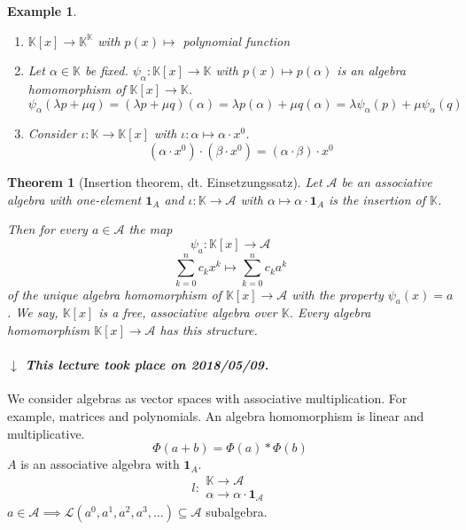 \documentclass{article}
\newcounter{lecref}[section]
\numberwithin{lecref}{section}
\newtheorem{theorem}[lecref]{Theorem}
\newtheorem{example}[lecref]{Example}
\newcommand{\dateref}[1]{%
  \begin{mdframed}[backgroundcolor=gray!10,innerbottommargin=0pt,innertopmargin=0pt]
    \paragraph{\textit{$\downarrow$ This lecture took place on #1.}}%
  \end{mdframed}%
}
\begin{document}
\begin{example} %
  \begin{enumerate}
    \item $\mathbb K[x] \to \mathbb K^{\mathbb K}$ with $p(x) \mapsto$ polynomial function
    \item
      Let $\alpha \in \mathbb K$ be fixed.
      $\psi_{\alpha}: \mathbb K[x] \to \mathbb K$ with $p(x) \mapsto p(\alpha)$ is an algebra homomorphism of $\mathbb K[x] \to \mathbb K$.
      \[ \psi_\alpha(\lambda p + \mu q) = (\lambda p + \mu q)(\alpha) = \lambda p(\alpha) + \mu q(\alpha) = \lambda \psi_{\alpha}(p) + \mu \psi_{\alpha}(q) \]
    \item Consider $\iota: \mathbb K \to \mathbb K[x]$ with $\iota: \alpha \mapsto \alpha \cdot x^0$.
      \[ (\alpha \cdot x^0) \cdot (\beta \cdot x^0) = (\alpha \cdot \beta) \cdot x^0 \]
  \end{enumerate}
\end{example}

\begin{theorem}[Insertion theorem, dt. \foreignlanguage{german}{Einsetzungssatz}] %
  Let $\mathcal A$ be an associative algebra with one-element $\mathbf 1_A$
  and $\iota: \mathbb K \to \mathcal A$ with $\alpha \mapsto \alpha \cdot \mathbf 1_A$ is the insertion of $\mathbb K$.

  Then for every $a \in \mathcal A$ the map
  \[ \psi_a: \mathbb K[x] \to \mathcal A \]
  \[ \sum_{k=0}^n c_k x^k \mapsto \sum_{k=0}^n c_k a^k \]
  of the unique algebra homomorphism of $\mathbb K[x] \to \mathcal A$ with the property $\psi_a(x) = a$.
  We say, $\mathbb K[x]$ is a \emph{free, associative algebra over $\mathbb K$}.
  Every algebra homomorphism $\mathbb K[x] \to \mathcal A$ has this structure.
\end{theorem}

\dateref{2018/05/09}

We consider algebras as vector spaces with associative multiplication. For example, matrices and polynomials.
An algebra homomorphism is linear and multiplicative.
\[ \Phi(a + b)= \Phi(a) * \Phi(b) \]
$A$ is an associative algebra with $\mathbf 1_A$.
\[ l: \substack{\mathbb K \to \mathcal A \\ \alpha \to \alpha \cdot \mathbf 1_{\mathcal A}} \]
$a \in \mathcal A \implies \mathcal L(a^0, a^1, a^2, a^3, \dots) \subseteq \mathcal A$ subalgebra.
\end{document}

